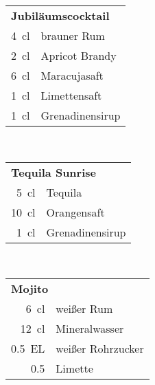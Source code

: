 \begin{table}[h!]
  \vspace{1cm}
  \begin{subtable}[t]{0.3\textwidth}
    \vspace{0pt}
    \begin{tabular}{|rl|} \hline
      \multicolumn{2}{|l|}{\textbf{Jubiläumscocktail}} \\
      \SI{4}{\centi\litre} & brauner Rum \\
      \SI{2}{\centi\litre} & Apricot Brandy \\
      \SI{6}{\centi\litre} & Maracujasaft \\
      \SI{1}{\centi\litre} & Limettensaft \\
      \SI{1}{\centi\litre} & Grenadinensirup \\ \hline
    \end{tabular}
  \end{subtable}
  ~
  \begin{subtable}[t]{0.3\textwidth}
    \vspace{0pt}
    \begin{tabular}{|rl|} \hline
      \multicolumn{2}{|l|}{\textbf{Tequila Sunrise}} \\
      \SI{5}{\centi\litre} & Tequila \\
      \SI{10}{\centi\litre} & Orangensaft \\
      \SI{1}{\centi\litre} & Grenadinensirup \\ \hline
    \end{tabular}
  \end{subtable}
  ~
  \begin{subtable}[t]{0.3\textwidth}
    \vspace{0pt}
    \begin{tabular}{|rl|} \hline
      \multicolumn{2}{|l|}{\textbf{Mojito}} \\
      \SI{6}{\centi\litre} & weißer Rum \\
      \SI{12}{\centi\litre} & Mineralwasser \\
      \SI{0.5}{EL} & weißer Rohrzucker \\
      \num{0.5} & Limette \\ \hline
    \end{tabular}
  \end{subtable}
  

\end{table}
